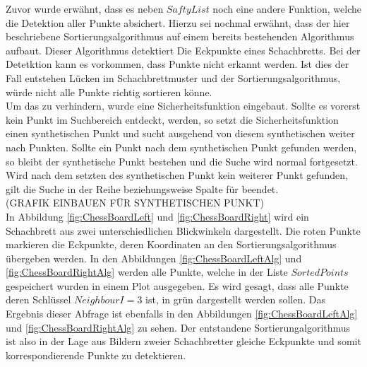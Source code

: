 Zuvor wurde erwähnt, dass es neben $SaftyList$ noch eine andere Funktion, welche die Detektion aller Punkte absichert. Hierzu sei nochmal erwähnt, dass der hier beschriebene Sortierungsalgorithmus auf einem bereits bestehenden Algorithmus aufbaut. Dieser Algorithmus detektiert Die Eckpunkte eines Schachbretts. Bei der Detetktion kann es vorkommen, dass Punkte nicht erkannt werden. Ist dies der Fall entstehen Lücken im Schachbrettmuster und der Sortierungsalgorithmus, würde nicht alle Punkte richtig sortieren könne.\\

Um das zu verhindern, wurde eine Sicherheitsfunktion eingebaut. Sollte es vorerst kein Punkt im Suchbereich entdeckt, werden, so setzt die Sicherheitsfunktion einen synthetischen Punkt und sucht ausgehend von diesem synthetischen weiter nach Punkten. Sollte ein Punkt nach dem synthetischen Punkt gefunden werden, so bleibt der synthetische Punkt bestehen und die Suche wird normal fortgesetzt. Wird nach dem setzten des synthetischen Punkt kein weiterer Punkt gefunden, gilt die Suche in der Reihe beziehungsweise Spalte für beendet.\\

(GRAFIK EINBAUEN FÜR SYNTHETISCHEN PUNKT)\\


In Abbildung \ref{fig:ChessBoardLeft} und \ref{fig:ChessBoardRight} wird ein Schachbrett aus zwei unterschiedlichen Blickwinkeln dargestellt. Die roten Punkte markieren die Eckpunkte, deren Koordinaten an den Sortierungsalgorithmus übergeben werden. In den Abbildungen \ref{fig:ChessBoardLeftAlg} und \ref{fig:ChessBoardRightAlg} werden alle Punkte, welche in der Liste $SortedPoints$ gespeichert wurden in einem Plot ausgegeben. Es wird gesagt, dass alle Punkte deren Schlüssel $NeighbourI = 3$ ist, in grün dargestellt werden sollen. Das Ergebnis dieser Abfrage ist ebenfalls in den Abbildungen \ref{fig:ChessBoardLeftAlg} und \ref{fig:ChessBoardRightAlg} zu sehen. Der entstandene Sortierungalgorithmus ist also in der Lage aus Bildern zweier Schachbretter gleiche Eckpunkte und somit korrespondierende Punkte zu detektieren. 


